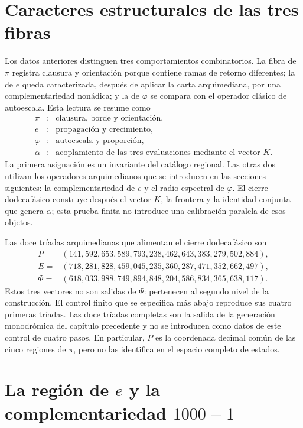 \section{Caracteres estructurales de las tres fibras}

Los datos anteriores distinguen tres comportamientos combinatorios. La fibra
de \(\pi\) registra clausura y orientación porque contiene ramas de retorno
diferentes; la de \(e\) queda caracterizada, después de aplicar la carta
arquimediana, por una complementariedad nonádica; y la de \(\varphi\) se
compara con el operador clásico de autoescala. Esta lectura se resume como
\[
\begin{array}{ccl}
\pi&:&\text{clausura, borde y orientación},\\
e&:&\text{propagación y crecimiento},\\
\varphi&:&\text{autoescala y proporción},\\
\alpha&:&\text{acoplamiento de las tres evaluaciones mediante el vector }K.
\end{array}
\]
La primera asignación es un invariante del catálogo regional. Las otras dos
utilizan los operadores arquimedianos que se introducen en las secciones
siguientes: la complementariedad de \(e\) y el radio espectral de
\(\varphi\). El cierre dodecafásico construye después el vector \(K\), la
frontera y la identidad conjunta que genera \(\alpha\); esta prueba finita no
introduce una calibración paralela de esos objetos.

Las doce tríadas arquimedianas que alimentan el cierre dodecafásico son
\[
\begin{aligned}
P={}&(141,592,653,589,793,238,462,643,383,279,502,884),\\
E={}&(718,281,828,459,045,235,360,287,471,352,662,497),\\
\Phi={}&(618,033,988,749,894,848,204,586,834,365,638,117).
\end{aligned}
\]
Estos tres vectores no son salidas de \(\Psi\): pertenecen al segundo nivel
de la construcción. El control finito que se especifica más abajo reproduce
sus cuatro primeras tríadas. Las doce tríadas completas son la salida de la
generación monodrómica del capítulo precedente y no se introducen como datos
de este control de cuatro pasos. En particular, \(P\) es la coordenada
decimal común de las cinco regiones de \(\pi\), pero no las identifica en el
espacio completo de estados.

\section{La región de \texorpdfstring{\(e\)}{e} y la complementariedad \texorpdfstring{\(1000-1\)}{1000-1}}

